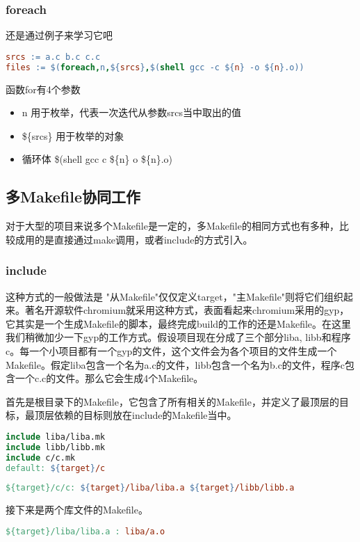 \subsubsection{foreach}
还是通过例子来学习它吧
\begin{lstlisting}[language=make]
srcs := a.c b.c c.c
files := $(foreach,n,${srcs},$(shell gcc -c ${n} -o ${n}.o))
\end{lstlisting}
函数for有4个参数
\begin{itemize}
\item n 用于枚举，代表一次迭代从参数srcs当中取出的值
\item \$\{srcs\} 用于枚举的对象
\item 循环体 \$(shell gcc \-c \$\{n\} \-o \$\{n\}.o) 
\end{itemize}

\subsection{多Makefile协同工作}
对于大型的项目来说多个Makefile是一定的，多Makefile的相同方式也有多种，比较成用的是直接通过make调用，或者include的方式引入。
\subsubsection{include}
这种方式的一般做法是 "从Makefile"仅仅定义target，"主Makefile"则将它们组织起来。著名开源软件chromium就采用这种方式，表面看起来chromium采用的gyp，它其实是一个生成Makefile的脚本，最终完成build的工作的还是Makefile。在这里我们稍微加少一下gyp的工作方式。假设项目现在分成了三个部分liba, libb和程序c。每一个小项目都有一个gyp的文件，这个文件会为各个项目的文件生成一个Makefile。假定liba包含一个名为a.c的文件，libb包含一个名为b.c的文件，程序c包含一个c.c的文件。那么它会生成4个Makefile。

首先是根目录下的Makefile，它包含了所有相关的Makefile，并定义了最顶层的目标，最顶层依赖的目标则放在include的Makefile当中。
\begin{lstlisting}[language=make]
include liba/liba.mk
include libb/libb.mk
include c/c.mk
default: ${target}/c
\end{lstlisting}

\begin{lstlisting}[language=make]
${target}/c/c: ${target}/liba/liba.a ${target}/libb/libb.a
\end{lstlisting}

接下来是两个库文件的Makefile。
\begin{lstlisting}[language=make]
${target}/liba/liba.a : liba/a.o
\end{lstlisting}

